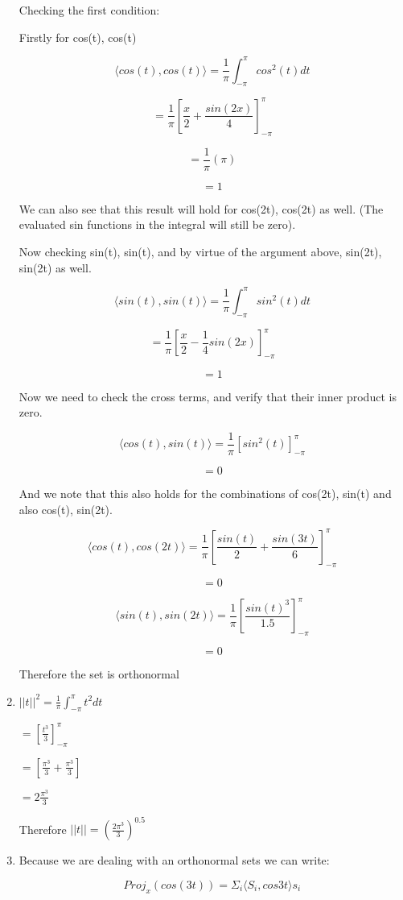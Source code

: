 \documentclass[letterpaper,12pt]{article}
\theoremstyle{definition}
\begin{document}
\begin{spacing}{1.3}{}
\begin{enumerate}
	Checking the first condition:

	Firstly for cos(t), cos(t)

	$$\langle cos(t), cos(t) \rangle = \frac{1}{\pi}\int_{-\pi}^{\pi} cos^{2}(t) dt$$

	$$= \frac{1}{\pi}[\frac{x}{2} + \frac{sin(2x)}{4}]_{-\pi}^{\pi}$$

	$$= \frac{1}{\pi}(\pi)$$

	$$=1$$

	We can also see that this result will hold for cos(2t), cos(2t) as well. (The evaluated sin functions in the integral will still be zero).

	Now checking sin(t), sin(t), and by virtue of the argument above, sin(2t), sin(2t) as well.

	$$\langle sin(t), sin(t) \rangle = \frac{1}{\pi}\int_{-\pi}^{\pi} sin^{2}(t) dt$$

	$$= \frac{1}{\pi}[\frac{x}{2} - \frac{1}{4}sin(2x)]_{-\pi}^{\pi}$$

	$$=1$$

	Now we need to check the cross terms, and verify that their inner product is zero.

	$$\langle cos(t), sin(t) \rangle = \frac{1}{\pi}[sin^2(t)]_{-\pi}^{\pi}$$

	$$=0$$

	And we note that this also holds for the combinations of cos(2t), sin(t) and also cos(t), sin(2t).

	$$\langle cos(t), cos(2t) \rangle = \frac{1}{\pi}[\frac{sin(t)}{2} + \frac{sin(3t)}{6}]_{-\pi}^{\pi}$$

	$$=0$$

	$$\langle sin(t), sin(2t) \rangle = \frac{1}{\pi}[\frac{sin(t)^3}{1.5}]_{-\pi}^{\pi}$$

	$$=0$$

	Therefore the set is orthonormal
  \item
  $||t||^2 = \frac{1}{\pi}\int_{-\pi}^{\pi}t^2 dt$

	$= [\frac{t^3}{3}]_{-\pi}^{\pi}$

	$= [\frac{\pi^3}{3} + \frac{\pi^3}{3}]$

	$= 2\frac{\pi^3}{3}$

	Therefore $||t|| = (\frac{2\pi^3}{3})^{0.5}$

  \item
  Because we are dealing with an orthonormal sets we can write:

	$$Proj_{x}(cos(3t)) = \Sigma_{i}\langle S_i , cos{3t} \rangle s_i$$


\end{enumerate}
\end{spacing}
\end{document}
